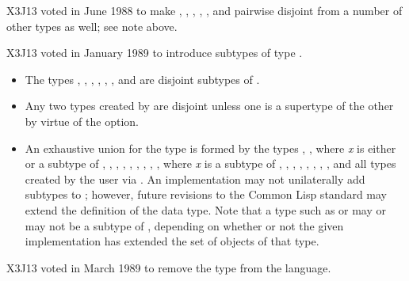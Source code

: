\begin{new}
X3J13 voted in June 1988
to make , , , ,
, and 
pairwise disjoint from a number of other types as well;
see note above.
\end{new}

\begin{new}
X3J13 voted in January 1989
to introduce subtypes of type .

\begin{itemize}
\item
The types , ,
, , , , and
 are disjoint subtypes of .
\end{itemize}
\end{new}

\begin{itemize}
\item
Any two types created by  are disjoint unless
one is a supertype of the other by virtue of
the  option.
\end{itemize}

\begin{obsolete}
\begin{itemize}
\item
An exhaustive union for the type  is formed by the types
, ,  where \emph{x} is either {\true} or 
a subtype
of , , , , ,
, , , ,
 where \emph{x} is a
subtype of ,
, , , , ,
, , and all types created by the user
via .
An implementation may not unilaterally add subtypes to
; however, future revisions to the Common Lisp standard may
extend the definition of the  data type.
Note that a type such as  or  may or may
not be a subtype of , depending on whether or not the given
implementation has extended the set of objects of that type.
\end{itemize}
\end{obsolete}

\begin{newer}
X3J13 voted in March 1989
to remove the type  from the language.
\end{newer}
